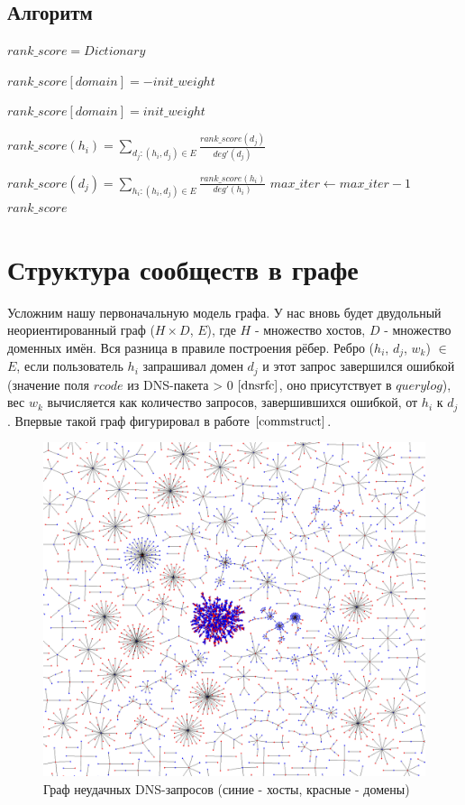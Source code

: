 \documentclass[14pt]{extreport} %
\begin{document}
\subsection{Алгоритм}
\begin{algorithmic}
	\State $rank\_score = Dictionary$
			
	\State $rank\_score[domain] = -init\_weight$
	\EndFor
			
	\State $rank\_score[domain] = init\_weight$
	\EndFor
		
	\State $rank\_score(h_i) = \sum_{d_j: (h_i, d_j)\in E} \frac{rank\_score(d_j)}{deg'(d_j)}$
	\EndFor
				
	\State $rank\_score(d_j) = \sum_{h_i: (h_i, d_j)\in E} \frac{rank\_score(h_i)}{deg'(h_i)}$
	\EndFor
	\State $max\_iter\gets max\_iter-1$
	\EndWhile
	\State \Return $rank\_score$
	\EndFunction
\end{algorithmic}

\section{Структура сообществ в графе}
\label{ssec:communitystruct}
Усложним нашу первоначальную модель графа. У нас вновь будет двудольный неориентированный граф ($H\times D$, $E$), где $H$ - множество хостов, $D$ - множество доменных имён. Вся разница в правиле построения рёбер. Ребро ($h_i$, $d_j$, $w_k$) $\in$ $E$, если пользователь $h_i$ запрашивал домен $d_j$ и этот запрос завершился ошибкой (значение поля $rcode$ из DNS-пакета > 0 $\cite{dnsrfc}$, оно присутствует в $querylog$), вес $w_k$ вычисляется как количество запросов, завершившихся ошибкой, от $h_i$ к $d_j$. Впервые такой граф фигурировал в работе $\cite{commstruct}$.
\\
\begin{figure}[H]
	\center
	\includegraphics[width=0.9\linewidth]{fail-graph.png}
	\caption{Граф неудачных DNS-запросов (синие - хосты, красные - домены)}
			
	\label{fig:subim1}
\end{figure}
	
\end{document}
